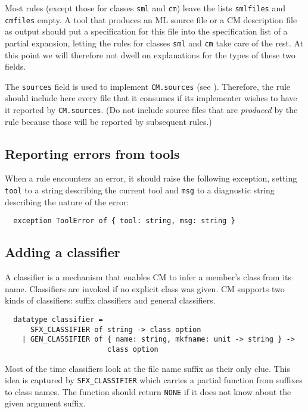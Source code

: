 Most rules (except those for classes {\tt sml} and {\tt cm}) leave the
lists {\tt smlfiles} and {\tt cmfiles} empty.  A tool that produces an
ML source file or a CM description file as output should put a
specification for this file into the specification list of a partial
expansion, letting the rules for classes {\tt sml} and {\tt cm} take
care of the rest.  At this point we will therefore not dwell on
explanations for the types of these two fields.

The {\tt sources} field is used to implement {\tt CM.sources} (see
).  Therefore, the rule should
include here every file that it consumes if its implementer wishes to
have it reported by {\tt CM.sources}.  (Do not include source files
that are {\em produced} by the rule because those will be reported by
subsequent rules.)

\subsection{Reporting errors from tools}

When a rule encounters an error, it should raise the following
exception, setting {\tt tool} to a string describing the current tool
and {\tt msg} to a diagnostic string describing the nature of the
error:

\begin{lstlisting}
  exception ToolError of { tool: string, msg: string }
\end{lstlisting}%

\subsection{Adding a classifier}

A classifier is a mechanism that enables CM to infer a member's class
from its name.  Classifiers are invoked if no explicit class was
given.  CM supports two kinds of classifiers: suffix classifiers and
general classifiers.

\begin{lstlisting}
  datatype classifier =
      SFX_CLASSIFIER of string -> class option
    | GEN_CLASSIFIER of { name: string, mkfname: unit -> string } ->
                        class option
\end{lstlisting}%

Most of the time classifiers look at the file name suffix as their only
clue.  This idea is captured by {\tt SFX\_CLASSIFIER} which carries a
partial function from suffixes to class names.  The function should
return {\tt NONE} if it does not know about the given argument suffix.

